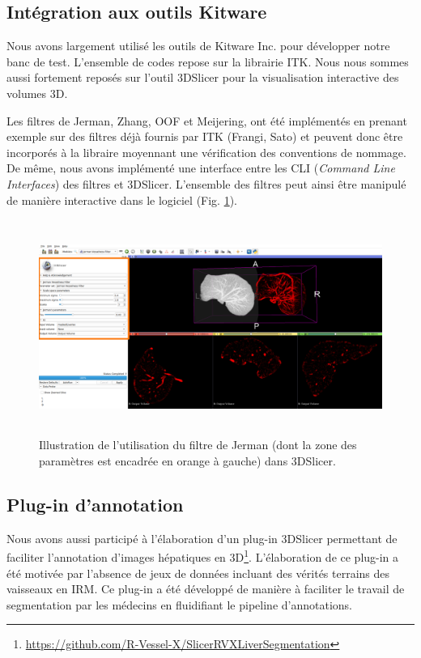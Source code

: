 \subsection{Intégration aux outils Kitware}
Nous avons largement utilisé les outils de Kitware Inc. pour développer notre banc de test. L'ensemble de codes repose sur la librairie ITK. Nous nous sommes aussi fortement reposés sur l'outil 3DSlicer pour la visualisation interactive des volumes 3D.

Les filtres de Jerman, Zhang, OOF et Meijering, ont été implémentés en prenant exemple sur des filtres déjà fournis par ITK (Frangi, Sato) et peuvent donc être incorporés à la libraire moyennant une vérification des conventions de nommage. De même, nous avons implémenté une interface entre les CLI (\textit{Command Line Interfaces}) des filtres et 3DSlicer. L'ensemble des filtres peut ainsi être manipulé de manière interactive dans le logiciel (Fig. \ref{fig:slicer_vesselness}).
\begin{figure}[!ht]
    \includegraphics[height=7cm]{Images/slicer_jerman.png}
    \caption{Illustration de l'utilisation du filtre de Jerman (dont la zone des paramètres est encadrée en orange à gauche) dans 3DSlicer.}
    \label{fig:slicer_vesselness}
\end{figure}

\subsection{Plug-in d'annotation}
Nous avons aussi participé à l'élaboration d'un plug-in 3DSlicer permettant de faciliter l'annotation d'images hépatiques en 3D\footnote{\url{https://github.com/R-Vessel-X/SlicerRVXLiverSegmentation}}. L'élaboration de ce plug-in a été motivée par l'absence de jeux de données incluant des vérités terrains des vaisseaux en IRM. Ce plug-in a été développé de manière à faciliter le travail de segmentation par les médecins en fluidifiant le pipeline d'annotations.

